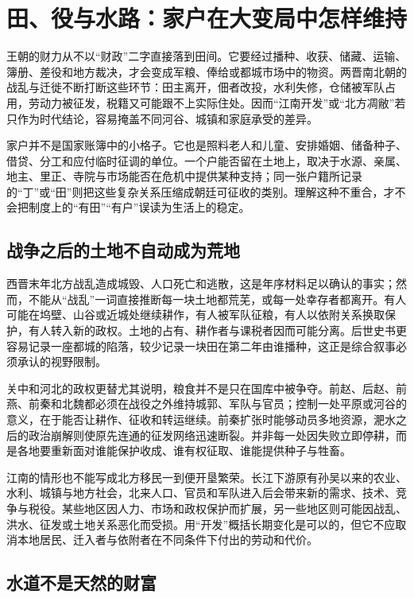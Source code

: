 \section{田、役与水路：家户在大变局中怎样维持}
\label{sec:synthesis-work-land-water}

王朝的财力从不以“财政”二字直接落到田间。它要经过播种、收获、储藏、运输、簿册、差役和地方裁决，才会变成军粮、俸给或都城市场中的物资。两晋南北朝的战乱与迁徙不断打断这些环节：田主离开，佃者改投，水利失修，仓储被军队占用，劳动力被征发，税籍又可能跟不上实际住处。因而“江南开发”或“北方凋敝”若只作为时代结论，容易掩盖不同河谷、城镇和家庭承受的差异。

家户并不是国家账簿中的小格子。它也是照料老人和儿童、安排婚姻、储备种子、借贷、分工和应付临时征调的单位。一个户能否留在土地上，取决于水源、亲属、地主、里正、寺院与市场能否在危机中提供某种支持；同一张户籍所记录的“丁”或“田”则把这些复杂关系压缩成朝廷可征收的类别。理解这种不重合，才不会把制度上的“有田”“有户”误读为生活上的稳定。

\subsection{战争之后的土地不自动成为荒地}

西晋末年北方战乱造成城毁、人口死亡和逃散，这是年序材料足以确认的事实；然而，不能从“战乱”一词直接推断每一块土地都荒芜，或每一处幸存者都离开。有人可能在坞壁、山谷或近城处继续耕作，有人被军队征粮，有人以依附关系换取保护，有人转入新的政权。土地的占有、耕作者与课税者因而可能分离。后世史书更容易记录一座都城的陷落，较少记录一块田在第二年由谁播种，这正是综合叙事必须承认的视野限制。

关中和河北的政权更替尤其说明，粮食并不是只在国库中被争夺。前赵、后赵、前燕、前秦和北魏都必须在战役之外维持城郭、军队与官员；控制一处平原或河谷的意义，在于能否让耕作、征收和转运继续。前秦扩张时能够动员多地资源，淝水之后的政治崩解则使原先连通的征发网络迅速断裂。并非每一处因失败立即停耕，而是各地要重新面对谁能保护收成、谁有权征取、谁能提供种子与牲畜。

江南的情形也不能写成北方移民一到便开垦繁荣。长江下游原有孙吴以来的农业、水利、城镇与地方社会，北来人口、官员和军队进入后会带来新的需求、技术、竞争与税役。某些地区因人力、市场和政权保护而扩展，另一些地区则可能因战乱、洪水、征发或土地关系恶化而受损。用“开发”概括长期变化是可以的，但它不应取消本地居民、迁入者与依附者在不同条件下付出的劳动和代价。

\subsection{水道不是天然的财富}

